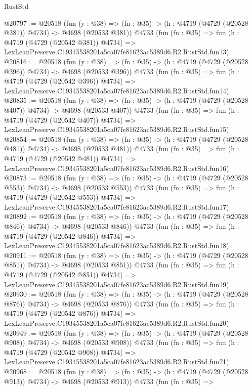 \begin{lexlean}{RustStd}
\begin{coremodule}
@20797 := @20518
    (fun (y : @38) => (fn : @35) -> (h : @4719 (@4729 (@20528 @381)) @4734) -> @4698 (@20533 @381))
    @4733
    (fun (fn : @35) =>
    fun (h : @4719 (@4729 (@20542 @381)) @4734) =>
    LexLeanPreserve.C19345538201a5ca07fe81623ac5389d6.R2.RustStd.fun13)
@20816 := @20518
    (fun (y : @38) => (fn : @35) -> (h : @4719 (@4729 (@20528 @396)) @4734) -> @4698 (@20533 @396))
    @4733
    (fun (fn : @35) =>
    fun (h : @4719 (@4729 (@20542 @396)) @4734) =>
    LexLeanPreserve.C19345538201a5ca07fe81623ac5389d6.R2.RustStd.fun14)
@20835 := @20518
    (fun (y : @38) => (fn : @35) -> (h : @4719 (@4729 (@20528 @407)) @4734) -> @4698 (@20533 @407))
    @4733
    (fun (fn : @35) =>
    fun (h : @4719 (@4729 (@20542 @407)) @4734) =>
    LexLeanPreserve.C19345538201a5ca07fe81623ac5389d6.R2.RustStd.fun15)
@20854 := @20518
    (fun (y : @38) => (fn : @35) -> (h : @4719 (@4729 (@20528 @481)) @4734) -> @4698 (@20533 @481))
    @4733
    (fun (fn : @35) =>
    fun (h : @4719 (@4729 (@20542 @481)) @4734) =>
    LexLeanPreserve.C19345538201a5ca07fe81623ac5389d6.R2.RustStd.fun16)
@20873 := @20518
    (fun (y : @38) => (fn : @35) -> (h : @4719 (@4729 (@20528 @553)) @4734) -> @4698 (@20533 @553))
    @4733
    (fun (fn : @35) =>
    fun (h : @4719 (@4729 (@20542 @553)) @4734) =>
    LexLeanPreserve.C19345538201a5ca07fe81623ac5389d6.R2.RustStd.fun17)
@20892 := @20518
    (fun (y : @38) => (fn : @35) -> (h : @4719 (@4729 (@20528 @846)) @4734) -> @4698 (@20533 @846))
    @4733
    (fun (fn : @35) =>
    fun (h : @4719 (@4729 (@20542 @846)) @4734) =>
    LexLeanPreserve.C19345538201a5ca07fe81623ac5389d6.R2.RustStd.fun18)
@20911 := @20518
    (fun (y : @38) => (fn : @35) -> (h : @4719 (@4729 (@20528 @851)) @4734) -> @4698 (@20533 @851))
    @4733
    (fun (fn : @35) =>
    fun (h : @4719 (@4729 (@20542 @851)) @4734) =>
    LexLeanPreserve.C19345538201a5ca07fe81623ac5389d6.R2.RustStd.fun19)
@20930 := @20518
    (fun (y : @38) => (fn : @35) -> (h : @4719 (@4729 (@20528 @876)) @4734) -> @4698 (@20533 @876))
    @4733
    (fun (fn : @35) =>
    fun (h : @4719 (@4729 (@20542 @876)) @4734) =>
    LexLeanPreserve.C19345538201a5ca07fe81623ac5389d6.R2.RustStd.fun20)
@20949 := @20518
    (fun (y : @38) => (fn : @35) -> (h : @4719 (@4729 (@20528 @908)) @4734) -> @4698 (@20533 @908))
    @4733
    (fun (fn : @35) =>
    fun (h : @4719 (@4729 (@20542 @908)) @4734) =>
    LexLeanPreserve.C19345538201a5ca07fe81623ac5389d6.R2.RustStd.fun21)
@20968 := @20518
    (fun (y : @38) => (fn : @35) -> (h : @4719 (@4729 (@20528 @913)) @4734) -> @4698 (@20533 @913))
    @4733
    (fun (fn : @35) =>

\end{coremodule}
\end{lexlean}
